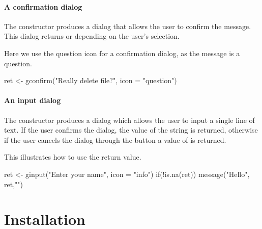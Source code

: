 \paragraph{A confirmation dialog}
The constructor  produces a dialog that allows
the user to confirm the message. This dialog returns  or
 depending on the user's selection.


Here we use the question icon for a confirmation dialog, as the message is a question.
\begin{Schunk}
\begin{Sinput}
 ret <- gconfirm("Really delete file?", icon = "question")
\end{Sinput}
\end{Schunk}


\paragraph{An input dialog}
The  constructor produces a dialog which allows
the user to input a single line of text. If the user confirms the
dialog, the value of the string is returned, otherwise if the user
cancels the dialog through the button a value of  is returned.


This illustrates how to use the return value.
\begin{Schunk}
\begin{Sinput}
 ret <- ginput("Enter your name", icon = "info")
 if(!is.na(ret)) 
   message("Hello", ret,"\n")
\end{Sinput}
\end{Schunk}







\section{Installation}
\label{sec:installation}


